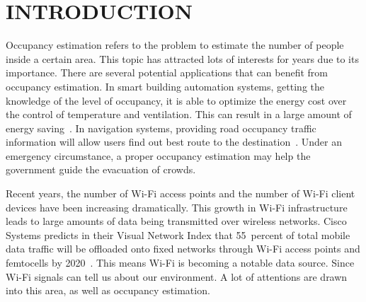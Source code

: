 \chapter[INTRODUCTION]{INTRODUCTION}
Occupancy estimation refers to the problem to estimate the number of people inside a certain area. 
This topic has attracted lots of interests for years due to its importance.
There are several potential applications that can benefit from occupancy estimation.
In smart building automation systems, getting the knowledge of the level of occupancy, it is able to optimize the energy cost over the control of temperature and ventilation.
This can result in a large amount of energy saving~\cite{Nguyen2013244,Balaji:2013:SOB:2517351.2517370}.
In navigation systems, providing road occupancy traffic information will allow users find out best route to the destination~\cite{5073548}.
Under an emergency circumstance, a proper occupancy estimation may help the government guide the evacuation of crowds. 

Recent years, the number of Wi-Fi access points and the number of Wi-Fi client devices have been increasing dramatically. This growth in Wi-Fi infrastructure leads to large amounts of data being transmitted over wireless networks. Cisco Systems predicts in their Visual Network Index that 55~percent of total mobile data traffic will be offloaded onto fixed networks through Wi-Fi access points and femtocells by 2020~\cite{CiscoVNI2016}. This means Wi-Fi is becoming a notable data source. Since Wi-Fi signals can tell us about our environment. A lot of attentions are drawn into this area, as well as occupancy estimation.

